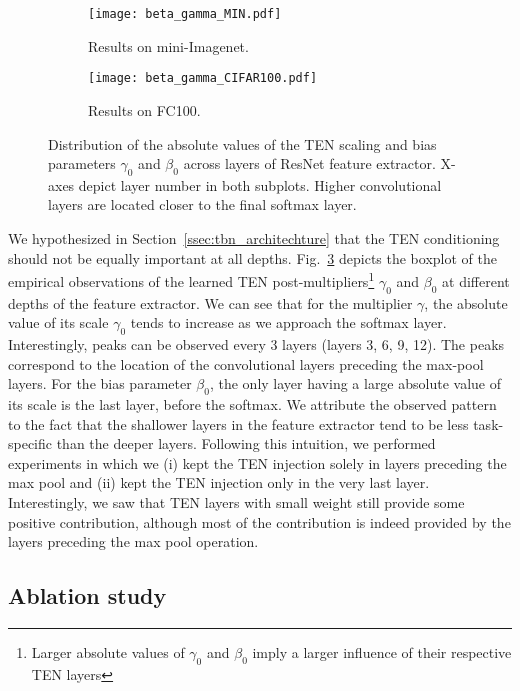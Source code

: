 \documentclass{article}
\begin{document}
\begin{figure}[t]
    \centering
    \begin{subfigure}[t]{0.49\textwidth}
        \texttt{[image: beta\_gamma\_MIN.pdf]}
        \caption{Results on mini-Imagenet.}
        \label{fig:tbn_scaling_miniimagenet}
    \end{subfigure}
    \begin{subfigure}[t]{0.49\textwidth}
        \texttt{[image: beta\_gamma\_CIFAR100.pdf]}
        \caption{Results on FC100.}
        \label{fig:tbn_scaling_cifar100}
    \end{subfigure}
    \caption{Distribution of the absolute values of the TEN scaling and bias parameters $\gamma_0$ and $\beta_0$ across layers of ResNet feature extractor. X-axes depict layer number in both subplots. Higher convolutional layers are located closer to the final softmax layer.}
    \label{fig:tbn_scaling}
\end{figure}

We hypothesized in Section~\ref{ssec:tbn_architechture} that the TEN conditioning should not be equally important at all depths. Fig.~\ref{fig:tbn_scaling} depicts the boxplot of the empirical observations of the learned TEN post-multipliers\footnote{Larger absolute values of $\gamma_0$ and $\beta_0$ imply a larger influence of their respective TEN layers} $\gamma_0$ and $\beta_0$ at different depths of the feature extractor. We can see that for the multiplier $\gamma$, the absolute value of its scale $\gamma_0$ tends to increase as we approach the softmax layer. Interestingly, peaks can be observed every 3 layers (layers 3, 6, 9, 12). The peaks correspond to the location of the convolutional layers preceding the max-pool layers. For the bias parameter $\beta_0$, the only layer having a large absolute value of its scale is the last layer, before the softmax. We attribute the observed pattern to the fact that the shallower layers in the feature extractor tend to be less task-specific than the deeper layers. Following this intuition, we performed experiments in which we (i) kept the TEN injection solely in layers preceding the max pool and (ii) kept the TEN injection only in the very last layer. Interestingly, we saw that TEN layers with small weight still provide some positive contribution, although most of the contribution is indeed provided by the layers preceding the max pool operation.


\subsection{Ablation study} \label{ssec:multitask_ablation}
\end{document}
